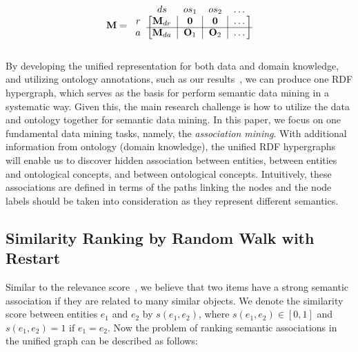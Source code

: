\begin{equation}
\label{striped_M}
\mathbf{M}=\begin{blockarray}{ccccc}
                ~ & ds & os_1 & os_2 & \dots \\
            \begin{block}{c[c|c|c|c]}
                r   &   \mathbf{M}_{dr}  &   \mathbf{0}   &   \mathbf{0}   &   \dots \\
                \cline{2-5}
                a   &   \mathbf{M}_{da}  &   \mathbf{O}_1 &   \mathbf{O}_2 &   \dots \\
            \end{block}
        \end{blockarray}
\end{equation}

By developing the unified representation for both data and domain knowledge, and utilizing ontology annotations, such as our results~\cite{LePendu2010}, we can produce one RDF hypergraph, which serves as the basis for perform semantic data mining in a systematic way. Given this, the main research challenge is how to utilize the data and ontology together for semantic data mining. In this paper, we focus on one fundamental data mining tasks, namely, the {\em association mining}. With additional information from ontology (domain knowledge), the unified RDF hypergraphs will enable us to discover hidden association between entities, between entities and ontological concepts, and between ontological concepts. Intuitively, these associations are defined in terms of the paths linking the nodes and the node labels should be taken into consideration as they represent different semantics.



\subsection{Similarity Ranking by Random Walk with Restart}

Similar to the relevance score~\cite{SunEtal05}, we believe that two items have a strong semantic association if they are related to many similar objects. We denote the similarity score between entities $e_1$ and $e_2$ by $s(e_1, e_2)$, where $s(e_1,e_2) \in [0, 1]$ and $s(e_1, e_2) = 1 \text{ if } e_1 = e_2$. Now the problem of ranking semantic associations in the unified graph can be described as follows:


